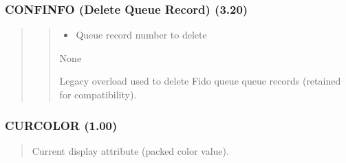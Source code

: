\documentclass[letterpaper,10pt,english]{sphinxmanual}
\begin{document}
\subsubsection{CONFINFO (Delete Queue Record) (3.20)}
\label{\detokenize{ppl:confinfo-delete-queue-record-3-20}}\begin{quote}

\sphinxAtStartPar
{}
\begin{quote}
\begin{description}
\begin{itemize}
\item {} 
\sphinxAtStartPar
{} \textendash{} Queue record number to delete

\end{itemize}

\sphinxAtStartPar
None

\sphinxAtStartPar
Legacy overload used to delete Fido queue queue records (retained for compatibility).

\end{description}

\sphinxAtStartPar
{}
\begin{quote}

\begin{sphinxVerbatim}[commandchars=\\\{\}]
\end{sphinxVerbatim}
\end{quote}
\end{quote}
\end{quote}


\subsubsection{CURCOLOR (1.00)}
\label{\detokenize{ppl:curcolor-1-00}}\begin{quote}

\sphinxAtStartPar
{}
\begin{description}
\sphinxAtStartPar
Current display attribute (packed color value).

\end{description}
\end{quote}
\end{document}
